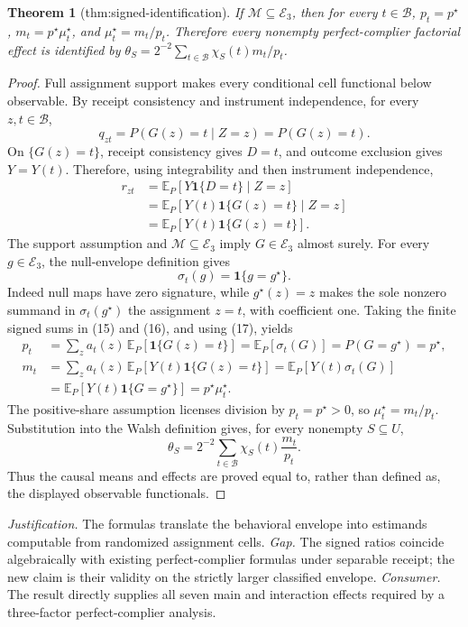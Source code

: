\documentclass{article}
\newtheorem{theorem}{Theorem}
\begin{document}
\begin{theorem}[thm:signed-identification]\label{thm:signed-identification}
If \(\mathcal M\subseteq\mathcal E_3\), then for every \(t\in\mathcal B\), \(p_t=p^\star\), \(m_t=p^\star\mu_t^\star\), and \(\mu_t^\star=m_t/p_t\). Therefore every nonempty perfect-complier factorial effect is identified by \(\theta_S=2^{-2}\sum_{t\in\mathcal B}\chi_S(t)m_t/p_t\).
\end{theorem}
\begin{proof}
Full assignment support makes every conditional cell functional below observable.  By receipt consistency and instrument independence, for every \(z,t\in\mathcal B\),
\[
q_{zt}
=P(G(z)=t\mid Z=z)
=P(G(z)=t). \tag{15}
\]
On \(\{G(z)=t\}\), receipt consistency gives \(D=t\), and outcome exclusion gives \(Y=Y(t)\).  Therefore, using integrability and then instrument independence,
\[
\begin{aligned}
r_{zt}
&=\mathbb E_P\!\left[Y\mathbf 1\{D=t\}\mid Z=z\right]\\
&=\mathbb E_P\!\left[Y(t)\mathbf 1\{G(z)=t\}\mid Z=z\right]\\
&=\mathbb E_P\!\left[Y(t)\mathbf 1\{G(z)=t\}\right].
\end{aligned} \tag{16}
\]
The support assumption and \(\mathcal M\subseteq\mathcal E_3\) imply \(G\in\mathcal E_3\) almost surely.  For every \(g\in\mathcal E_3\), the null-envelope definition gives
\[
\sigma_t(g)=\mathbf 1\{g=g^\star\}. \tag{17}
\]
Indeed null maps have zero signature, while \(g^\star(z)=z\) makes the sole nonzero summand in \(\sigma_t(g^\star)\) the assignment \(z=t\), with coefficient one.  Taking the finite signed sums in (15) and (16), and using (17), yields
\[
\begin{aligned}
p_t
&=\sum_z a_t(z)\,\mathbb E_P[\mathbf 1\{G(z)=t\}]
=\mathbb E_P[\sigma_t(G)]
=P(G=g^\star)=p^\star,\\
m_t
&=\sum_z a_t(z)\,\mathbb E_P[Y(t)\mathbf 1\{G(z)=t\}]
=\mathbb E_P[Y(t)\sigma_t(G)]\\
&=\mathbb E_P[Y(t)\mathbf 1\{G=g^\star\}]
=p^\star\mu_t^\star.
\end{aligned} \tag{18}
\]
The positive-share assumption licenses division by \(p_t=p^\star>0\), so \(\mu_t^\star=m_t/p_t\).  Substitution into the Walsh definition gives, for every nonempty \(S\subseteq U\),
\[
\theta_S=2^{-2}\sum_{t\in\mathcal B}\chi_S(t)\frac{m_t}{p_t}.
\]
Thus the causal means and effects are proved equal to, rather than defined as, the displayed observable functionals.
\end{proof}
\par\smallskip\noindent \textit{Justification.} The formulas translate the behavioral envelope into estimands computable from randomized assignment cells. \textit{Gap.} The signed ratios coincide algebraically with existing perfect-complier formulas under separable receipt; the new claim is their validity on the strictly larger classified envelope. \textit{Consumer.} The result directly supplies all seven main and interaction effects required by a three-factor perfect-complier analysis.
\end{document}

